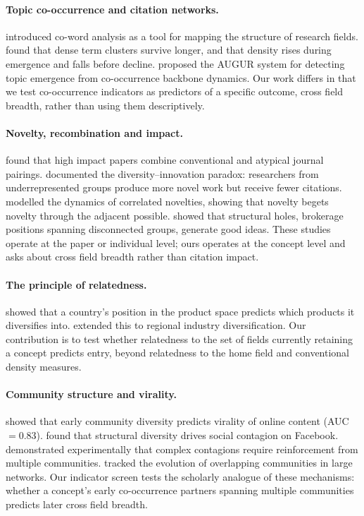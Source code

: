 \documentclass[11pt,letterpaper]{article}
\begin{document}
\paragraph{Topic co-occurrence and citation networks.}
\citet{Callon1991} introduced co-word analysis as a tool for mapping the
structure of research fields. \citet{Chavalarias2013} found that dense term
clusters survive longer, and that density rises during emergence and falls
before decline. \citet{Salatino2018} proposed the AUGUR system for detecting
topic emergence from co-occurrence backbone dynamics. Our work differs in that
we test co-occurrence indicators as predictors of a specific outcome, cross field
breadth, rather than using them descriptively.

\paragraph{Novelty, recombination and impact.}
\citet{Uzzi2013} found that high impact papers combine conventional and atypical
journal pairings. \citet{Hofstra2019} documented the diversity--innovation
paradox: researchers from underrepresented groups produce more novel work but
receive fewer citations. \citet{Tria2013} modelled the dynamics of correlated
novelties, showing that novelty begets novelty through the adjacent possible.
\citet{Burt2004} showed that structural holes, brokerage positions spanning
disconnected groups, generate good ideas. These studies operate at the paper or
individual level; ours operates at the concept level and asks about cross field
breadth rather than citation impact.

\paragraph{The principle of relatedness.}
\citet{Hidalgo2007} showed that a country's position in the product space
predicts which products it diversifies into. \citet{Neffke2011} extended this to
regional industry diversification. Our contribution is to test whether
relatedness to the set of fields currently retaining a concept predicts entry,
beyond relatedness to the home field and conventional density measures.

\paragraph{Community structure and virality.}
\citet{Weng2013} showed that early community diversity predicts virality of
online content (AUC $= 0.83$). \citet{Ugander2012} found that structural
diversity drives social contagion on Facebook. \citet{Centola2010} demonstrated
experimentally that complex contagions require reinforcement from multiple
communities. \citet{Palla2007} tracked the evolution of overlapping communities
in large networks. Our indicator screen tests the scholarly analogue of these
mechanisms: whether a concept's early co-occurrence partners spanning multiple
communities predicts later cross field breadth.
\end{document}
